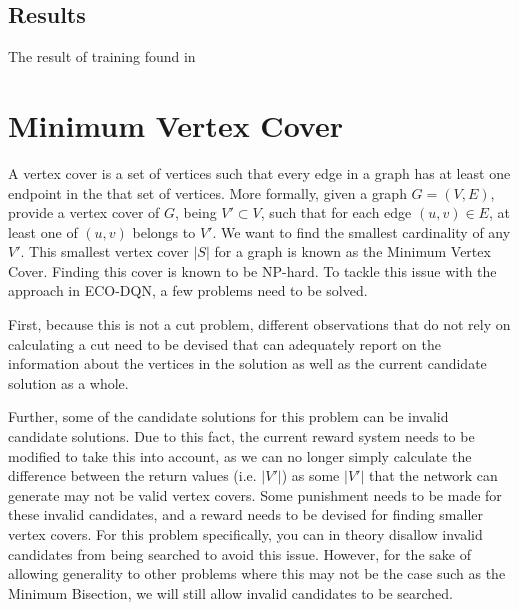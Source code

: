 \documentclass{article}
\begin{document}
\subsection{Results}\label{sec:results-min-cut}

The result of training found in %


\section{Minimum Vertex Cover}\label{sec:mvc}

A vertex cover is a set of vertices such that every edge in a graph has at least one endpoint in the that set of vertices. More formally, given a graph $G = (V, E)$, provide a vertex cover of $G$, being $V' \subset V$, such that for each edge $(u, v) \in E$, at least one of $(u, v)$ belongs to $V'$. We want to find the smallest cardinality of any $V'$. This smallest vertex cover $|S|$ for a graph is known as the Minimum Vertex Cover. Finding this cover is known to be NP-hard. To tackle this issue with the approach in ECO-DQN, a few problems need to be solved.

First, because this is not a cut problem, different observations that do not rely on calculating a cut need to be devised that can adequately report on the information about the vertices in the solution as well as the current candidate solution as a whole. 

Further, some of the candidate solutions for this problem can be invalid candidate solutions. Due to this fact, the current reward system needs to be modified to take this into account, as we can no longer simply calculate the difference between the return values (i.e. $|V'|$) as some $|V'|$ that the network can generate may not be valid vertex covers. Some punishment needs to be made for these invalid candidates, and a reward needs to be devised for finding smaller vertex covers. For this problem specifically, you can in theory disallow invalid candidates from being searched to avoid this issue. However, for the sake of allowing generality to other problems where this may not be the case such as the Minimum Bisection, we will still allow invalid candidates to be searched. 
\end{document}

